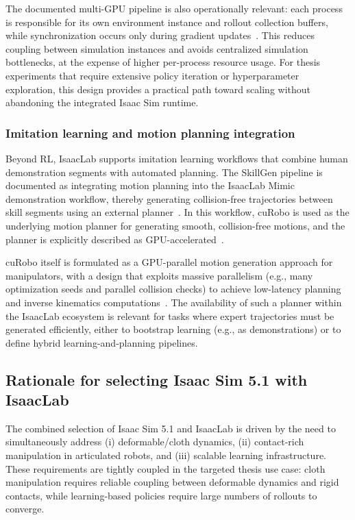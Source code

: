 The documented multi-\ac{GPU} pipeline is also operationally relevant: each process is responsible for its own environment instance and rollout collection buffers, while synchronization occurs only during gradient updates~\cite{isaaclab_multi_gpu_multinode}. This reduces coupling between simulation instances and avoids centralized simulation bottlenecks, at the expense of higher per-process resource usage. For thesis experiments that require extensive policy iteration or hyperparameter exploration, this design provides a practical path toward scaling without abandoning the integrated Isaac Sim runtime.

\subsubsection{Imitation learning and motion planning integration}
Beyond \ac{RL}, IsaacLab supports imitation learning workflows that combine human demonstration segments with automated planning. The SkillGen pipeline is documented as integrating motion planning into the IsaacLab Mimic demonstration workflow, thereby generating collision-free trajectories between skill segments using an external planner~\cite{isaaclab_skillgen}. In this workflow, cuRobo is used as the underlying motion planner for generating smooth, collision-free motions, and the planner is explicitly described as GPU-accelerated~\cite{isaaclab_skillgen}.

cuRobo itself is formulated as a GPU-parallel motion generation approach for manipulators, with a design that exploits massive parallelism (e.g., many optimization seeds and parallel collision checks) to achieve low-latency planning and inverse kinematics computations~\cite{Sundaralingam2023cuRobo}. The availability of such a planner within the IsaacLab ecosystem is relevant for tasks where expert trajectories must be generated efficiently, either to bootstrap learning (e.g., as demonstrations) or to define hybrid learning-and-planning pipelines.

\subsection{Rationale for selecting Isaac Sim 5.1 with IsaacLab}
The combined selection of Isaac Sim 5.1 and IsaacLab is driven by the need to simultaneously address (i) deformable/cloth dynamics, (ii) contact-rich manipulation in articulated robots, and (iii) scalable learning infrastructure. These requirements are tightly coupled in the targeted thesis use case: cloth manipulation requires reliable coupling between deformable dynamics and rigid contacts, while learning-based policies require large numbers of rollouts to converge.

